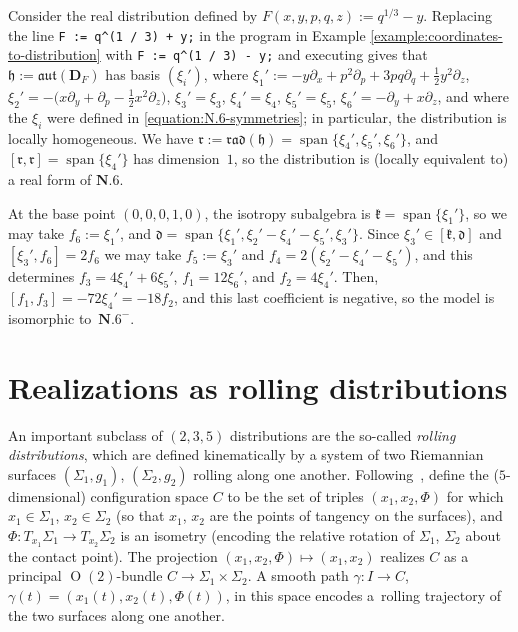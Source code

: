 \documentclass[pdftex]{sigma}
\DeclareMathOperator{\spanOperator}{span}
\newcommand{\Span}[1]{\spanOperator\{{#1}\}}
\newcommand{\mbD}{\mathbf{D}}
\newcommand{\mfd} {\mathfrak{d}}
\newcommand{\mfh} {\mathfrak{h}}
\newcommand{\mfk} {\mathfrak{k}}
\newcommand{\mfr} {\mathfrak{r}}
\newcommand{\mfaut}{\mathfrak{aut}}
\newcommand{\mfrad}{\mathfrak{rad}}
\numberwithin{equation}{section}
\begin{document}
\begin{Example}\label{example:N.6-Monge}
Consider the real distribution defined by $F(x, y, p, q, z) := q^{1 / 3} - y$. Replacing the line \texttt{F := q\^{}(1 / 3) + y;} in the program in Example \ref{example:coordinates-to-distribution} with \texttt{F := q\^{}(1 / 3) - y;} and executing gives that $\mfh := \mfaut(\mbD_F)$ has basis $(\xi_i')$, where $\xi_1' := -y \partial_x + p^2 \partial_p + 3 p q \partial_q + \frac{1}{2} y^2 \partial_z$, $\xi_2' = -\big(x \partial_y + \partial_p - \frac{1}{2} x^2 \partial_z\big)$, $\xi_3' = \xi_3$, $\xi_4' = \xi_4$, $\xi_5' = \xi_5$, $\xi_6' = -\partial_y + x \partial_z$, and where the $\xi_i$ were defined in \eqref{equation:N.6-symmetries}; in particular, the distribution is locally homogeneous. We have $\mfr := \mfrad(\mfh) = \Span{\xi_4', \xi_5', \xi_6'}$, and $[\mfr, \mfr] = \Span{\xi_4'}$ has dimension~$1$, so the distribution is (locally equivalent to) a real form of $\mathbf{N.6}$.

At the base point $(0, 0, 0, 1, 0)$, the isotropy subalgebra is $\mfk = \Span{\xi_1'}$, so we may take $f_6 := \xi_1'$, and $\mfd = \Span{\xi_1', \xi_2' - \xi_4' - \xi_5', \xi_3'}$. Since $\xi_3' \in [\mfk, \mfd]$ and $[\xi_3', f_6] = 2 f_6$ we may take $f_5 := \xi_3'$ and $f_4 = 2(\xi_2' - \xi_4' - \xi_5')$, and this determines $f_3 = 4 \xi_4' + 6 \xi_5'$, $f_1 = 12 \xi_6'$, and $f_2 = 4 \xi_4'$. Then, $[f_1, f_3] = -72 \xi_4' = -18 f_2$, and this last coefficient is negative, so the model is isomorphic to~$\mathbf{N.6}^-$.
\end{Example}

\section{Realizations as rolling distributions}\label{section:rolling}

An important subclass of $(2, 3, 5)$ distributions are the so-called \textit{rolling distributions}, which are defined kinematically by a system of two Riemannian surfaces $(\Sigma_1, g_1)$, $(\Sigma_2, g_2)$ rolling along one another. Following~\cite{BryantHsu}, define the ($5$-dimensional) configuration space $C$ to be the set of triples $(x_1, x_2, \Phi)$ for which $x_1 \in \Sigma_1$, $x_2 \in \Sigma_2$ (so that $x_1$, $x_2$ are the points of tangency on the surfaces), and $\Phi\colon T_{x_1} \Sigma_1 \to T_{x_2} \Sigma_2$ is an isometry (encoding the relative rotation of $\Sigma_1$, $\Sigma_2$ about the contact point). The projection $(x_1, x_2, \Phi) \mapsto (x_1, x_2)$ realizes $C$ as a principal $\operatorname{O}(2)$-bundle $C \to \Sigma_1 \times \Sigma_2$. A smooth path $\gamma\colon I \to C$, $\gamma(t) = (x_1(t), x_2(t), \Phi(t))$, in this space encodes a~rolling trajectory of the two surfaces along one another.
\end{document}
